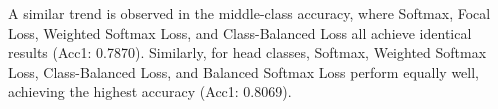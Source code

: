 A similar trend is observed in the middle-class accuracy, where Softmax, Focal Loss, Weighted Softmax Loss, and Class-Balanced Loss all achieve identical results (Acc1: 0.7870). Similarly, for head classes, Softmax, Weighted Softmax Loss, Class-Balanced Loss, and Balanced Softmax Loss perform equally well, achieving the highest accuracy (Acc1: 0.8069). %









% 

